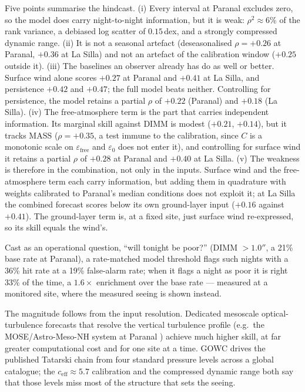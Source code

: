 \documentclass[11pt]{article}
\begin{document}
Five points summarise the hindcast. (i) Every interval at Paranal excludes zero, so
the model does carry night-to-night information, but it is weak:
$\rho^2\approx6\%$ of the rank variance, a debiased log scatter of $0.15$\,dex, and a
strongly compressed dynamic range. (ii) It is not a seasonal artefact (deseasonalised
$\rho=+0.26$ at Paranal, $+0.36$ at La Silla) and not an artefact of the calibration
window ($+0.25$ outside it). (iii) The baselines an observer already has do as well or
better. Surface wind alone scores $+0.27$ at Paranal and $+0.41$ at La Silla, and
persistence $+0.42$ and $+0.47$; the full model beats neither. Controlling for
persistence, the model retains a partial $\rho$ of $+0.22$ (Paranal) and $+0.18$ (La
Silla). (iv) The free-atmosphere term is the part that carries independent
information. Its marginal skill against DIMM is modest ($+0.21$, $+0.14$), but it
tracks MASS ($\rho=+0.35$, a test immune to the calibration, since $C$ is a
monotonic scale on $\varepsilon_{\text{free}}$ and $\varepsilon_0$ does not enter it),
and controlling for surface wind it retains a partial $\rho$ of $+0.28$ at Paranal and
$+0.40$ at La Silla. (v) The weakness is therefore in the combination, not only in
the inputs. Surface wind and the free-atmosphere term each carry information, but
adding them in quadrature with weights calibrated to Paranal's median conditions does
not exploit it; at La Silla the combined forecast scores below its own ground-layer
input ($+0.16$ against $+0.41$). The ground-layer term is, at a fixed site, just
surface wind re-expressed, so its skill equals the wind's.

Cast as an operational question, ``will tonight be poor?'' (DIMM $>1.0''$, a 21\%
base rate at Paranal), a rate-matched model threshold flags such nights with a 36\%
hit rate at a 19\% false-alarm rate; when it flags a night as poor it is right 33\% of
the time, a $1.6\times$ enrichment over the base rate --- measured at a monitored site,
where the measured seeing is shown instead.

The magnitude follows from the input resolution. Dedicated mesoscale
optical-turbulence forecasts that resolve the vertical turbulence profile (e.g.\ the
MOSE/Astro-Meso-NH system at Paranal \cite{masciadri}) achieve much higher skill, at
far greater computational cost and for one site at a time. GOWC drives the published
Tatarski chain from four standard pressure levels across a global catalogue; the
$c_{\text{eff}}\approx5.7$ calibration and the compressed dynamic range both say that
those levels miss most of the structure that sets the seeing.
\end{document}
